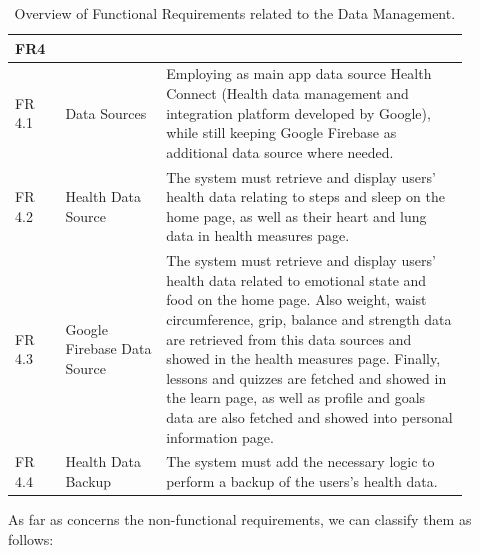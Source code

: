 \begin{table}[h!]
    \setstretch{\myspacing}
    \centering
    \begin{tabular}{|>{\raggedright\arraybackslash}p{0.1\linewidth}|>{\raggedright\arraybackslash}p{0.2\linewidth}|>{\raggedright\arraybackslash}p{0.6\linewidth}|}
        \hline
        \textbf{FR4} & \multicolumn{2}{>{\centering\arraybackslash}p{0.7\linewidth}|}{\textbf{Data Management}} \\
        \hline
        FR 4.1 & Data Sources & Employing as main app data source Health Connect (Health data management and integration platform developed by Google), while still keeping Google Firebase as additional data source where needed. \\
        \hline
        FR 4.2 & Health Data Source & The system must retrieve and display users' health data relating to steps and sleep on the home page, as well as their heart and lung data in health measures page. \\
        \hline
        FR 4.3 & Google Firebase Data Source & The system must retrieve and display users' health data related to emotional state and food on the home page. Also weight, waist circumference, grip, balance and strength data are retrieved from this data sources and showed in the health measures page. Finally, lessons and quizzes are fetched and showed in the learn page, as well as profile and goals data are also fetched and showed into personal information page. \\
        \hline
        FR 4.4 & Health Data Backup & The system must add the necessary logic to perform a backup of the users's health data. \\
        \hline
    \end{tabular}
    \caption{Overview of Functional Requirements related to the Data Management.}
    \label{tab:fr4}
\end{table}

\clearpage

\noindent As far as concerns the non-functional requirements, we can classify them as follows:

